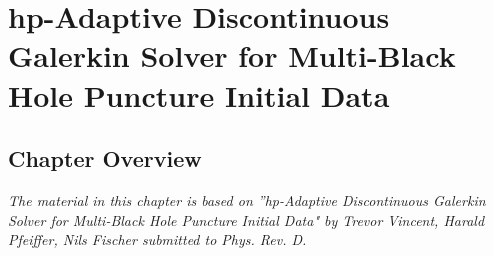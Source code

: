 \chapter{hp-Adaptive Discontinuous Galerkin Solver for Multi-Black Hole Puncture Initial Data}

\section{Chapter Overview}

\textit{The material in this chapter is based on ”hp-Adaptive Discontinuous Galerkin Solver for Multi-Black Hole Puncture Initial Data" by Trevor Vincent, Harald Pfeiffer, Nils Fischer submitted to Phys. Rev. D.}

\newcommand{\harald}[1]{\textcolor{RawSienna}{#1}}
\newcommand{\red}{\textcolor{red}}

